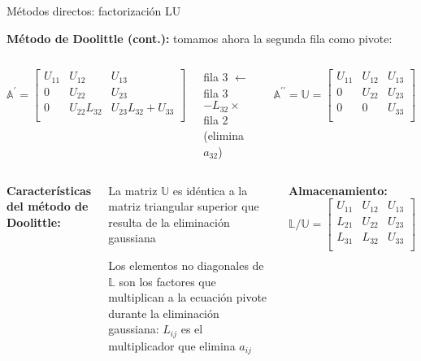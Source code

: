\documentclass[9pt, aspectratio=169]{beamer}
\begin{document}
\begin{frame}{Métodos directos: factorización LU}

 \textbf{Método de Doolittle (cont.):} tomamos ahora la segunda fila como pivote:
\begin{columns}
\cx
\begin{equation*}
 \mathbb{A}^{\prime}= \left[ \begin{array}{ccc}
 U_{11} & U_{12} & U_{13} \\
 0 & U_{22} & U_{23} \\
 0 & U_{22}L_{32} & U_{23} L_{32} + U_{33} \\
 \end{array} \right]
\end{equation*}

\cx
 \begin{center}
  fila 3 $\leftarrow$ fila 3 $- L_{32} \times$ fila 2 (elimina $a_{32}$)
 \end{center}
 \begin{equation*}
\mathbb{A}^{\prime \prime} = \mathbb{U} = \left[ 
 \begin{array}{ccc}
 U_{11} & U_{12} & U_{13} \\
 0 & U_{22} & U_{23} \\
 0 & 0 & U_{33} \\
 \end{array} \right]
  \end{equation*}
\end{columns}
 \bigskip \pause
 \begin{columns}[t]
\textbf{Características del método de Doolittle:} \medskip
 
 \begin{itemize} {\small
  \item La matriz $\mathbb{U}$ es idéntica a la matriz triangular superior que resulta de la eliminación gaussiana
  \medskip
  
  \item Los elementos no diagonales de $\mathbb{L}$ son los factores que multiplican a la ecuación pivote durante la eliminación gaussiana: $L_{ij}$ es el multiplicador que elimina $a_{ij}$ }
 \end{itemize} \pause
{}
\textbf{Almacenamiento:} \bigskip
 \begin{equation*}
\mathbb{L}/\mathbb{U} = \left[ 
 \begin{array}{ccc}
 U_{11} & U_{12} & U_{13} \\
 L_{21} & U_{22} & U_{23} \\
 L_{31} & L_{32} & U_{33} \\
 \end{array} \right]
  \end{equation*}
 \end{columns}
\end{frame}
\end{document}
